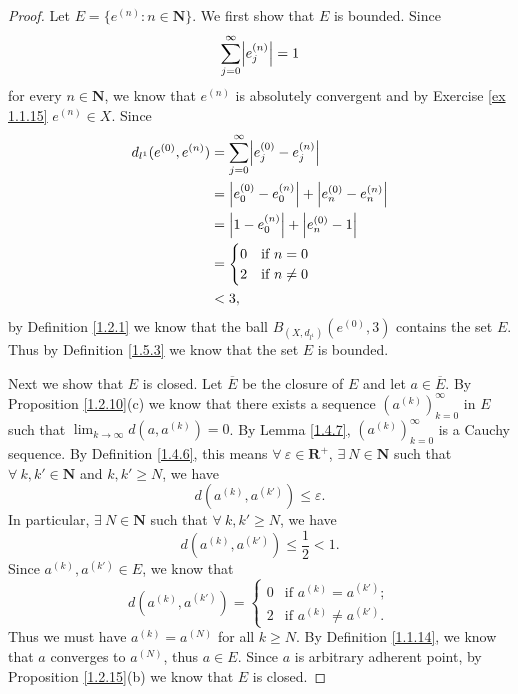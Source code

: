 \begin{proof}
    Let \(E = \{e^{(n)} : n \in \mathbf{N}\}\).
    We first show that \(E\) is bounded.
    Since
    \[
        \sum_{j = 0}^\infty \abs*{e_j^{(n)}} = 1
    \]
    for every \(n \in \mathbf{N}\), we know that \(e^{(n)}\) is absolutely convergent and by Exercise \ref{ex 1.1.15} \(e^{(n)} \in X\).
    Since
    \begin{align*}
        d_{l^1}(e^{(0)}, e^{(n)}) & = \sum_{j = 0}^\infty \abs*{e_j^{(0)} - e_j^{(n)}}            \\
                                  & = \abs*{e_0^{(0)} - e_0^{(n)}} + \abs*{e_n^{(0)} - e_n^{(n)}} \\
                                  & = \abs*{1 - e_0^{(n)}} + \abs*{e_n^{(0)} - 1}                 \\
                                  & = \begin{cases}
            0 & \text{if } n = 0    \\
            2 & \text{if } n \neq 0
        \end{cases}                                  \\
                                  & < 3,
    \end{align*}
    by Definition \ref{1.2.1} we know that the ball \(B_{(X, d_{l^1})}(e^{(0)}, 3)\) contains the set \(E\).
    Thus by Definition \ref{1.5.3} we know that the set \(E\) is bounded.

    Next we show that \(E\) is closed.
    Let \(\overline{E}\) be the closure of \(E\) and let \(a \in \overline{E}\).
    By Proposition \ref{1.2.10}(c) we know that there exists a sequence \((a^{(k)})_{k = 0}^\infty\) in \(E\) such that \(\lim_{k \to \infty} d(a, a^{(k)}) = 0\).
    By Lemma \ref{1.4.7}, \((a^{(k)})_{k = 0}^\infty\) is a Cauchy sequence.
    By Definition \ref{1.4.6}, this means \(\forall\ \varepsilon \in \mathbf{R}^+\), \(\exists\ N \in \mathbf{N}\) such that \(\forall\ k, k' \in \mathbf{N}\) and \(k, k' \geq N\), we have
    \[
        d(a^{(k)}, a^{(k')}) \leq \varepsilon.
    \]
    In particular, \(\exists\ N \in \mathbf{N}\) such that \(\forall\ k, k' \geq N\), we have
    \[
        d(a^{(k)}, a^{(k')}) \leq \frac{1}{2} < 1.
    \]
    Since \(a^{(k)}, a^{(k')} \in E\), we know that
    \[
        d(a^{(k)}, a^{(k')}) = \begin{cases}
            0 & \text{if } a^{(k)} = a^{(k')};    \\
            2 & \text{if } a^{(k)} \neq a^{(k')}.
        \end{cases}
    \]
    Thus we must have \(a^{(k)} = a^{(N)}\) for all \(k \geq N\).
    By Definition \ref{1.1.14}, we know that \(a\) converges to \(a^{(N)}\), thus \(a \in E\).
    Since \(a\) is arbitrary adherent point, by Proposition \ref{1.2.15}(b) we know that \(E\) is closed.


\end{proof}
